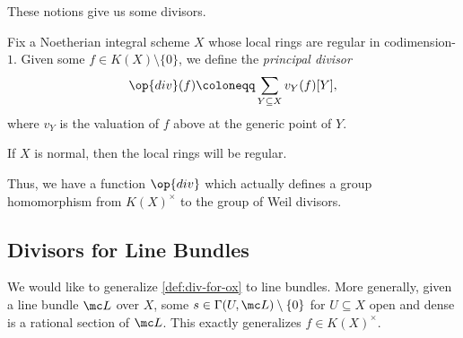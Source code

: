 \documentclass[../notes.tex]{subfiles}
\begin{document}
These notions give us some divisors.
\begin{definition} \label{def:div-for-ox}
	Fix a Noetherian integral scheme $X$ whose local rings are regular in codimension-$1$. Given some $f\in K(X)\setminus\{0\}$, we define the \textit{principal divisor}
	\[\op{div}(f)\coloneqq\sum_{Y\subseteq X}v_Y(f)[Y],\]
	where $v_Y$ is the valuation of $f$ above at the generic point of $Y$.
\end{definition}
\begin{remark}
	If $X$ is normal, then the local rings will be regular.
\end{remark}
\begin{remark}
	Thus, we have a function $\op{div}$ which actually defines a group homomorphism from $K(X)^\times$ to the group of Weil divisors.
\end{remark}

\subsection{Divisors for Line Bundles}
We would like to generalize \autoref{def:div-for-ox} to line bundles. More generally, given a line bundle $\mc L$ over $X$, some $s\in\Gamma(U,\mc L)\setminus\{0\}$ for $U\subseteq X$ open and dense is a rational section of $\mc L$. This exactly generalizes $f\in K(X)^\times$.
\end{document}
